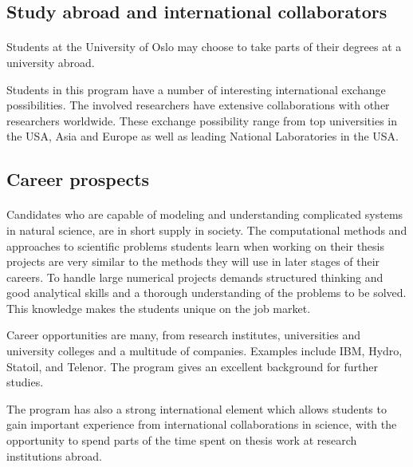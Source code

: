 \documentclass[%
oneside,                 %
final,                   %
10pt]{article}
\begin{document}
\subsection{Study abroad and international collaborators}


\paragraph{}

Students at the University of Oslo may choose to take parts of
their degrees at a university abroad.

Students in this program have a number of interesting international
exchange possibilities. The involved researchers have extensive
collaborations with other researchers worldwide. These exchange
possibility range from top universities in the USA, Asia and Europe as
well as leading National Laboratories in the USA.



\subsection{Career prospects}


\paragraph{}
Candidates who are capable of modeling and understanding complicated
systems in natural science, are in short supply in society.  The
computational methods and approaches to scientific problems students learn
when working on their thesis projects are very similar to the methods
they will use in later stages of their careers.  To handle large
numerical projects demands structured thinking and good analytical
skills and a thorough understanding of the problems to be solved. This
knowledge makes the students unique on the job market.

Career opportunities are many, from research institutes, universities
and university colleges and a multitude of companies. Examples
include IBM, Hydro, Statoil, and Telenor.  The program gives an
excellent background for further studies.

The program has also a strong international element which allows students to
gain important experience from international collaborations in
science, with the opportunity to spend parts of the time spent on
thesis work at research institutions abroad.
\end{document}
